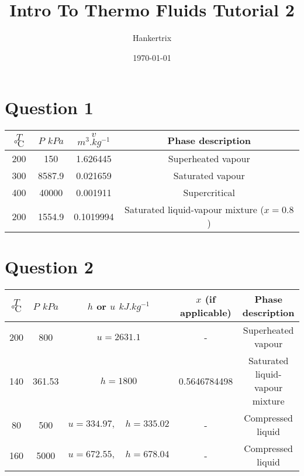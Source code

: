 \documentclass[11pt]{article}
\author{Hankertrix}
\date{\today}
\title{Intro To Thermo Fluids Tutorial 2}
\begin{document}
\maketitle
\setcounter{tocdepth}{2}
\tableofcontents \clearpage
\section{Question 1}
\label{sec:org4439c25}
\begin{center}
\begin{tabular}{|c|c|c|c|}
\hline
\(T\) \(\unit{\degreeCelsius}\) & \(P\) \(\unit{kPa}\) & \(v\) \(\unit{m^3.kg^{-1}}\) & Phase description\\[0pt]
\hline
200 & 150 & 1.626445 & Superheated vapour\\[0pt]
300 & 8587.9 & 0.021659 & Saturated vapour\\[0pt]
400 & 40000 & 0.001911 & Supercritical\\[0pt]
200 & 1554.9 & 0.1019994 & Saturated liquid-vapour mixture (\(x = 0.8\))\\[0pt]
\hline
\end{tabular}
\end{center}

\section{Question 2}
\label{sec:org33739f6}
\begin{center}
\begin{tabular}{|c|c|c|c|c|}
\hline
\(T\) \(\unit{\degreeCelsius}\) & \(P\) \(\unit{kPa}\) & \(h\) or \(u\) \(\unit{kJ.kg^{-1}}\) & \(x\) (if applicable) & Phase description\\[0pt]
\hline
200 & 800 & \(u = 2631.1\) & - & Superheated vapour\\[0pt]
140 & 361.53 & \(h = 1800\) & 0.5646784498 & Saturated liquid-vapour mixture\\[0pt]
80 & 500 & \(u = 334.97, \quad h = 335.02\) & - & Compressed liquid\\[0pt]
160 & 5000 & \(u = 672.55, \quad h = 678.04\) & - & Compressed liquid\\[0pt]
\hline
\end{tabular}
\end{center}
\end{document}
